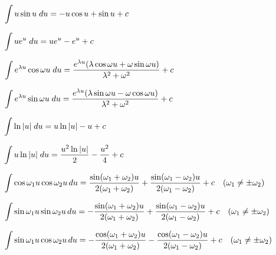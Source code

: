 \begin{description}
  \item $\displaystyle\int u\sin u\;du=-u\cos u+\sin u+c$

  \item $\displaystyle\int ue^{u}\;du=ue^{u}-e^{u}+c$

  \item $\displaystyle\int e^{\lambda u}\cos\omega u\;du=\frac{e^{\lambda u}(\lambda\cos\omega u+\omega\sin\omega u)}{\lambda^{2}+\omega^{2}}+c$

  \item $\displaystyle\int e^{\lambda u}\sin\omega u\;du=\frac{e^{\lambda u}(\lambda\sin\omega u-\omega\cos\omega u)}{\lambda^{2}+\omega^{2}}+c$

  \item $\displaystyle\int\ln|u|\;du=u\ln|u|-u+c$

  \item $\displaystyle\int u\ln|u|\;du=\frac{u^{2}\ln|u|}{2}-\frac{u^{2}}{4}+c$

  \item $\displaystyle\int\cos\omega_{1}u\cos\omega_{2}u\,du=\frac{\sin(\omega_{1}+\omega_{2})u}{2(\omega_{1}+\omega_{2})}+\frac{\sin(\omega_{1}-\omega_{2})u}{2(\omega_{1}-\omega_{2})}+c\quad(\omega_{1}\ne\pm\omega_{2})$

  \item $\displaystyle\int\sin\omega_{1}u\sin\omega_{2}u\,du=-\frac{\sin(\omega_{1}+\omega_{2})u}{2(\omega_{1}+\omega_{2})}+\frac{\sin(\omega_{1}-\omega_{2})u}{2(\omega_{1}-\omega_{2})}+c\quad(\omega_{1}\ne\pm\omega_{2})$

  \item $\displaystyle\int\sin\omega_{1}u\cos\omega_{2}u\,du=-\frac{\cos(\omega_{1}+\omega_{2})u}{2(\omega_{1}+\omega_{2})}-\frac{\cos(\omega_{1}-\omega_{2})u}{2(\omega_{1}-\omega_{2})}+c\quad(\omega_{1}\ne\pm\omega_{2})$
\end{description}
